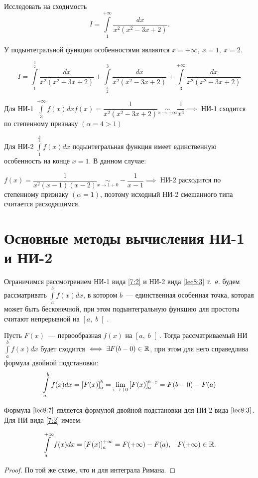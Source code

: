 \documentclass[../../main.tex]{subfiles}
\begin{document}
\begin{exmp} Исследовать на сходимость
\[I = \int\limits_{1}^{+\infty}\dfrac{dx}{x^2(x^2 - 3x + 2)}.\]

У подынтегральной функции особенностями являются $x = +\infty,\ x = 1,\ x = 
2$.

\[I = \int\limits_{1}^{\frac{3}{2}}\dfrac{dx}{x^2(x^2 - 3x +2 )} + 
\int\limits_{\frac{3}{2}}^{3}\dfrac{dx}{x^2(x^2 - 3x +2 )} + 
\int\limits_{3}^{+\infty}\dfrac{dx}{x^2(x^2 - 3x +2 )}\]

Для НИ-1 $\displaystyle\int\limits_{3}^{+\infty}f(x)dx f(x) = 
\dfrac{1}{x^2(x^2 -3x + 2)} \underset{x \to +\infty} \sim \dfrac{1}{x^4} 
\implies$ НИ-1 сходится по степенному признаку $\left(\alpha = 4 > 1\right)$

Для НИ-2 $\displaystyle\int\limits_{1}^{\frac{3}{2}}f(x)dx$ подынтегральная 
функция имеет единственную особенность на конце $x = 1$. В данном случае:

$f(x) = \dfrac{1}{x^2(x-1)(x-2)} \underset{x \to 1 + 0}\sim -\dfrac{1}{x - 1} 
\implies$ НИ-2 расходится по степенному признаку $\left(\alpha = 1\right)$, 
поэтому исходный НИ-2 смешанного типа считается расходящимся. 
\end{exmp}

\section{Основные методы вычисления НИ-1 и НИ-2}

Ограничимся рассмотрением НИ-1 вида \eqref{7:2} и НИ-2 вида \eqref{lec8:3}
т.~е. будем 
рассматривать $\displaystyle\int\limits_{a}^{b}f(x)dx$, в котором $b$~--- 
единственная особенная точка, которая может быть бесконечной, при этом 
подынтегральную функцию для простоты считают непрерывной на $\left[a,\; 
b\right[$. 

\begin{thm}
Пусть $F(x)$~--- первообразная $f(x)$ на $\left[a,\; b\right[$. Тогда 
рассматриваемый НИ $\displaystyle\int\limits_{a}^{b}f(x)dx$ будет сходится 
$\iff \exists F(b-0)\in \mathbb{R}$, при этом для него справедлива формула двойной 
подстановки:
\begin{equation}\label{lec8:7}
\int\limits_{a}^{b}f(x)dx = \left[F(x)\right]_{a}^{b} = \underset{\varepsilon \to 
+0}\lim\left[F(x)\right]_{a}^{b - \varepsilon} = F(b - 0) - F(a) 
\end{equation}

Формула $\eqref{lec8:7}$ является формулой двойной подстановки для НИ-2 вида 
$\eqref{lec8:3}$. Для НИ вида \eqref{7:2} имеем:

\begin{equation}\label{lec8:8}
\int\limits_{a}^{+\infty}f(x)dx = \left[F(x)\right]_{a}^{+\infty} = F(+\infty) 
- F(a), \;\;\; F(+\infty) \in \mathbb{R}.
\end{equation}
\end{thm}

\begin{proof}
По той же схеме, что и для интеграла Римана.
\end{proof}
\end{document}
